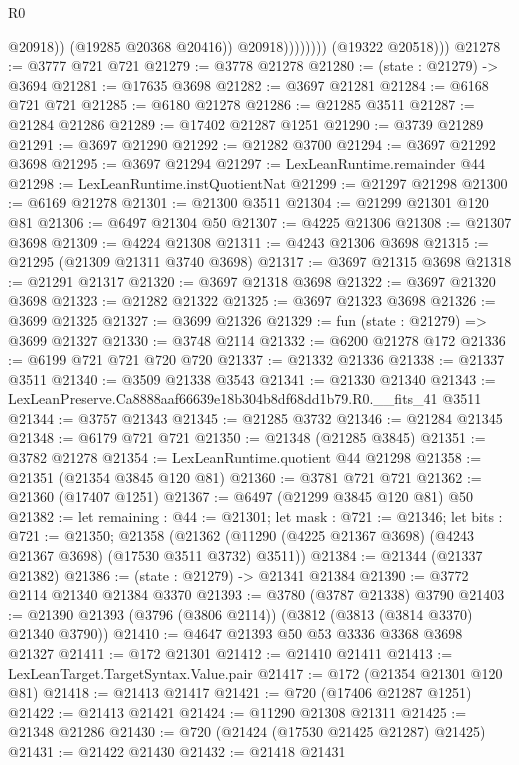 \begin{lexlean}{R0}
\begin{coremodule}
                              @20918))
                          (@19285 @20368 @20416))
                        @20918))))))))
        (@19322 @20518)))
@21278 := @3777 @721 @721
@21279 := @3778 @21278
@21280 := (state : @21279) -> @3694
@21281 := @17635 @3698
@21282 := @3697 @21281
@21284 := @6168 @721 @721
@21285 := @6180 @21278
@21286 := @21285 @3511
@21287 := @21284 @21286
@21289 := @17402 @21287 @1251
@21290 := @3739 @21289
@21291 := @3697 @21290
@21292 := @21282 @3700
@21294 := @3697 @21292 @3698
@21295 := @3697 @21294
@21297 := LexLeanRuntime.remainder @44
@21298 := LexLeanRuntime.instQuotientNat
@21299 := @21297 @21298
@21300 := @6169 @21278
@21301 := @21300 @3511
@21304 := @21299 @21301 @120 @81
@21306 := @6497 @21304 @50
@21307 := @4225 @21306
@21308 := @21307 @3698
@21309 := @4224 @21308
@21311 := @4243 @21306 @3698
@21315 := @21295 (@21309 @21311 @3740 @3698)
@21317 := @3697 @21315 @3698
@21318 := @21291 @21317
@21320 := @3697 @21318 @3698
@21322 := @3697 @21320 @3698
@21323 := @21282 @21322
@21325 := @3697 @21323 @3698
@21326 := @3699 @21325
@21327 := @3699 @21326
@21329 := fun (state : @21279) => @3699 @21327
@21330 := @3748 @2114
@21332 := @6200 @21278 @172
@21336 := @6199 @721 @721 @720 @720
@21337 := @21332 @21336
@21338 := @21337 @3511
@21340 := @3509 @21338 @3543
@21341 := @21330 @21340
@21343 := LexLeanPreserve.Ca8888aaf66639e18b304b8df68dd1b79.R0.__fits_41 @3511
@21344 := @3757 @21343
@21345 := @21285 @3732
@21346 := @21284 @21345
@21348 := @6179 @721 @721
@21350 := @21348 (@21285 @3845)
@21351 := @3782 @21278
@21354 := LexLeanRuntime.quotient @44 @21298
@21358 := @21351 (@21354 @3845 @120 @81)
@21360 := @3781 @721 @721
@21362 := @21360 (@17407 @1251)
@21367 := @6497 (@21299 @3845 @120 @81) @50
@21382 := let remaining : @44 := @21301;
  let mask : @721 := @21346;
  let bits : @721 := @21350;
  @21358 (@21362 (@11290 (@4225 @21367 @3698) (@4243 @21367 @3698) (@17530 @3511 @3732) @3511))
@21384 := @21344 (@21337 @21382)
@21386 := (state : @21279) -> @21341 @21384
@21390 := @3772 @2114 @21340 @21384 @3370
@21393 := @3780 (@3787 @21338) @3790
@21403 := @21390 @21393 (@3796 (@3806 @2114)) (@3812 (@3813 (@3814 @3370) @21340 @3790))
@21410 := @4647 @21393 @50 @53 @3336 @3368 @3698 @21327
@21411 := @172 @21301
@21412 := @21410 @21411
@21413 := LexLeanTarget.TargetSyntax.Value.pair
@21417 := @172 (@21354 @21301 @120 @81)
@21418 := @21413 @21417
@21421 := @720 (@17406 @21287 @1251)
@21422 := @21413 @21421
@21424 := @11290 @21308 @21311
@21425 := @21348 @21286
@21430 := @720 (@21424 (@17530 @21425 @21287) @21425)
@21431 := @21422 @21430
@21432 := @21418 @21431

\end{coremodule}
\end{lexlean}
